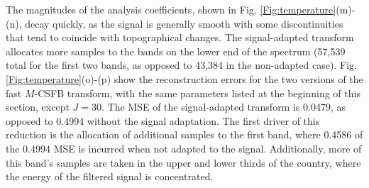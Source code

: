 \documentclass[journal, 10pt]{IEEEtran}
\begin{document}
The magnitudes of the analysis coefficients, shown in Fig. \ref{Fig:temperature}(m)-(n), decay quickly, %
as the signal is generally smooth with some discontinuities that tend to coincide with topographical changes. %
The signal-adapted transform allocates more samples to the bands on the lower end of the spectrum (57,539 total for the first two bands, as opposed to 43,384 in the non-adapted case).
Fig. \ref{Fig:temperature}(o)-(p) show the reconstruction errors for the two versions of the fast $M$-CSFB transform, with the same parameters listed at the beginning of this section, except $J=30$. The MSE of the signal-adapted transform is 0.0479, as opposed to 0.4994 without the signal adaptation. The first driver of this reduction is the allocation of additional samples to the first band, where 0.4586 of the 0.4994 MSE is incurred when not adapted to the signal. Additionally, more of this band's samples %
are taken in the upper and lower thirds of the country, where the energy of the filtered signal is concentrated. 

\end{document}
